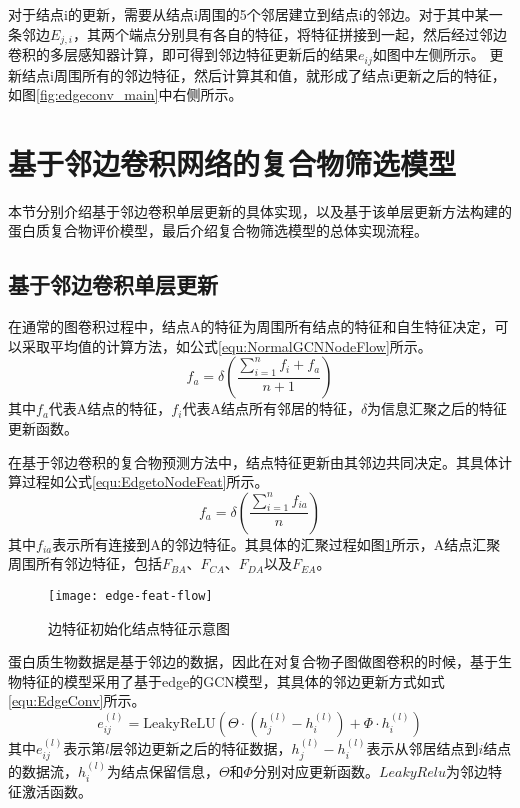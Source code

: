 对于结点i的更新，需要从结点i周围的5个邻居建立到结点i的邻边。对于其中某一条邻边$E_{j,i}$，其两个端点分别具有各自的特征，将特征拼接到一起，然后经过邻边卷积的多层感知器计算，即可得到邻边特征更新后的结果$e_{ij}$如图中左侧所示。
更新结点i周围所有的邻边特征，然后计算其和值，就形成了结点i更新之后的特征，如图\ref{fig:edgeconv_main}中右侧所示。

\section{基于邻边卷积网络的复合物筛选模型}
\label{section:EdgeConv:detail}
本节分别介绍基于邻边卷积单层更新的具体实现，以及基于该单层更新方法构建的蛋白质复合物评价模型，最后介绍复合物筛选模型的总体实现流程。

\subsection{基于邻边卷积单层更新}
\label{subsection:EdgeConv:single}

在通常的图卷积过程中，结点A的特征为周围所有结点的特征和自生特征决定，可以采取平均值的计算方法，如公式\ref{equ:NormalGCNNodeFlow}所示。
\begin{equation}
    \label{equ:NormalGCNNodeFlow}
    f_a=\delta (\frac{\sum_{i = 1}^{n}f_i+f_a}{n+1})
\end{equation}
其中$f_a$代表A结点的特征，$f_i$代表A结点所有邻居的特征，$\delta$为信息汇聚之后的特征更新函数。

在基于邻边卷积的复合物预测方法中，结点特征更新由其邻边共同决定。其具体计算过程如公式\ref{equ:EdgetoNodeFeat}所示。
\begin{equation}
    \label{equ:EdgetoNodeFeat}
    f_a=\delta (\frac{\sum_{i = 1}^{n}f_{ia}}{n})
\end{equation}
其中$f_{ia}$表示所有连接到A的邻边特征。其具体的汇聚过程如图\ref{fig:edge-feat-flow}所示，A结点汇聚周围所有邻边特征，包括$F_{BA}$、$F_{CA}$、$F_{DA}$以及$F_{EA}$。

\begin{figure}[htbp]
    \centering
    \texttt{[image: edge-feat-flow]}
    \caption{边特征初始化结点特征示意图}
    \label{fig:edge-feat-flow}
\end{figure}

蛋白质生物数据是基于邻边的数据，因此在对复合物子图做图卷积的时候，基于生物特征的模型采用了基于edge的GCN模型\cite{wang_dynamic_2019}，其具体的邻边更新方式如式\ref{equ:EdgeConv}所示。
\begin{equation}
    \label{equ:EdgeConv}
    e_{ij}^{(l)} = \mathrm{LeakyReLU}(
    \Theta \cdot (h_j^{(l)} - h_i^{(l)}) + \Phi \cdot h_i^{(l)})
\end{equation}
其中$e_{ij}^{(l)}$表示第$l$层邻边更新之后的特征数据，$h_j^{(l)} - h_i^{(l)}$表示从邻居结点到$i$结点的数据流，$h_i^{(l)}$为结点保留信息，$\Theta$和$\Phi$分别对应更新函数。$LeakyRelu$为邻边特征激活函数。

